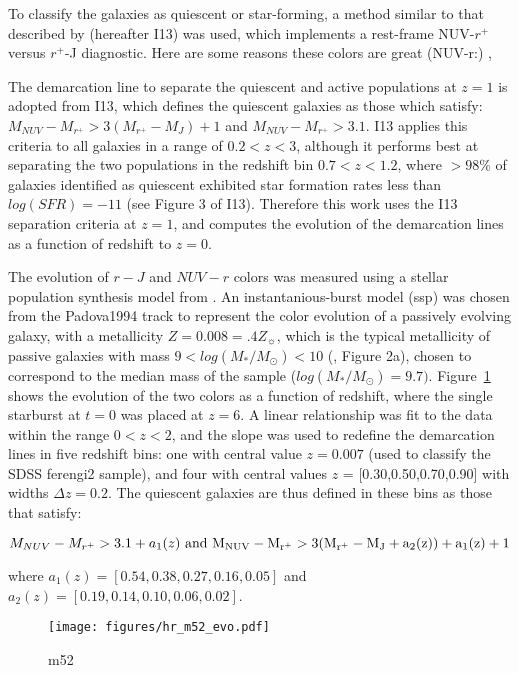To classify the galaxies as quiescent or star-forming, a method similar to that described by \citet{Ilbert2013} (hereafter I13) was used, which implements a rest-frame NUV-$r^{+}$ versus $r^{+}$-J diagnostic. Here are some reasons these colors are great (NUV-r:) \citep{Arnouts2007a,Salim2005a,Wyder2007},\citep{Martin2007}

The demarcation line to separate the quiescent and active populations at $z=1$ is adopted from I13, which defines the quiescent galaxies as those which satisfy: $M_{NUV}-M_{r^{+}} > 3(M_{r^{+}}-M_{J})+1$ and $M_{NUV}-M_{r^{+}} > 3.1$. I13 applies this criteria to all galaxies in a range of $0.2<z<3$, although it performs best at separating the two populations in the redshift bin $0.7<z<1.2$, where $>98\%$ of galaxies identified as quiescent exhibited star formation rates less than $log(SFR) = -11$ (see Figure 3 of I13). Therefore this work uses the I13 separation criteria at $z=1$, and computes the evolution of the demarcation lines as a function of redshift to $z=0$. 

The evolution of $r-J$ and $NUV-r$ colors was measured using a stellar population synthesis model from \citet{Bruzual2003}. An instantanious-burst model (ssp) was chosen from the Padova1994 track to represent the color evolution of a passively evolving galaxy, with a metallicity $Z=0.008=.4Z_{\sun}$, which is the typical metallicity of passive galaxies with mass $9 < log(M_{*}/M_{\odot}) < 10$ (\citet{Peng2015}, Figure 2a), chosen to correspond to the median mass of the sample ($log(M_{*}/M_{\odot})=9.7)$. Figure~\ref{fig:bcmodel} shows the evolution of the two colors as a function of redshift, where the single starburst at $t=0$ was placed at $z=6$. A linear relationship was fit to the data within the range $0<z<2$, and the slope was used to redefine the demarcation lines in five redshift bins: one with central value $z=0.007$ (used to classify the SDSS ferengi2 sample), and four with central values $z$ = [0.30,0.50,0.70,0.90] with widths $\Delta z=0.2$. The quiescent galaxies are thus defined in these bins as those that satisfy:

\begin{equation}
M_{NUV}-M_{r^{+}} > 3.1 + a_{1}(z)
~\rm and~
M_{NUV}-M_{r^{+}} > 3(M_{r^{+}}-M_{J} + a_{2}(z))+ a_{1}(z) + 1  
\end{equation}

where $a_{1}(z) = [0.54,0.38,0.27,0.16,0.05]$ and $a_{2}(z) = [0.19,0.14,0.10,0.06,0.02]$. 

\begin{figure}
\centering
\texttt{[image: figures/hr\_m52\_evo.pdf]} 
\caption{m52}
\label{fig:bcmodel}
\end{figure}
